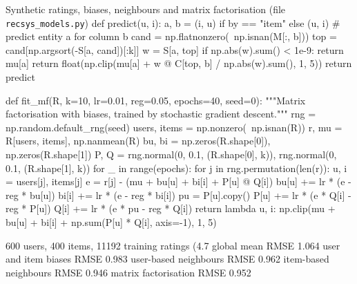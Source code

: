 \begin{pylisting}[label={lst:recmodels}]{Synthetic ratings, biases, neighbours and matrix factorisation (file \texttt{recsys\_models.py})}
    def predict(u, i):
        a, b = (i, u) if by == "item" else (u, i)      # predict entity a for column b
        cand = np.flatnonzero(~np.isnan(M[:, b]))
        top = cand[np.argsort(-S[a, cand])[:k]]
        w = S[a, top]
        if np.abs(w).sum() < 1e-9:
            return mu[a]
        return float(np.clip(mu[a] + w @ C[top, b] / np.abs(w).sum(), 1, 5))
    return predict

def fit_mf(R, k=10, lr=0.01, reg=0.05, epochs=40, seed=0):
    """Matrix factorisation with biases, trained by stochastic gradient descent."""
    rng = np.random.default_rng(seed)
    users, items = np.nonzero(~np.isnan(R))
    r, mu = R[users, items], np.nanmean(R)
    bu, bi = np.zeros(R.shape[0]), np.zeros(R.shape[1])
    P, Q = rng.normal(0, 0.1, (R.shape[0], k)), rng.normal(0, 0.1, (R.shape[1], k))
    for _ in range(epochs):
        for j in rng.permutation(len(r)):
            u, i = users[j], items[j]
            e = r[j] - (mu + bu[u] + bi[i] + P[u] @ Q[i])
            bu[u] += lr * (e - reg * bu[u])
            bi[i] += lr * (e - reg * bi[i])
            pu = P[u].copy()
            P[u] += lr * (e * Q[i] - reg * P[u])
            Q[i] += lr * (e * pu - reg * Q[i])
    return lambda u, i: np.clip(mu + bu[u] + bi[i] + np.sum(P[u] * Q[i], axis=-1), 1, 5)
\end{pylisting}

\begin{pyoutput}
600 users, 400 items, 11192 training ratings (4.7%
global mean            RMSE 1.064
user and item biases   RMSE 0.983
user-based neighbours  RMSE 0.962
item-based neighbours  RMSE 0.946
matrix factorisation   RMSE 0.952
\end{pyoutput}

